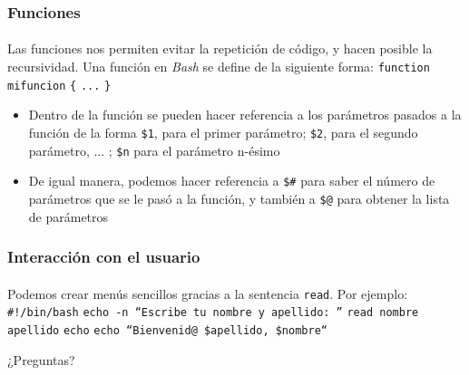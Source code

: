 \documentclass[12pt]{beamer}
\begin{document}
\begin{frame}
  \frametitle{Funciones}
  \framesubtitle{}
  Las funciones nos permiten evitar la repetición de código, y hacen posible la recursividad. Una función en \textit{Bash} se define de la siguiente forma:
  \medskip\linebreak
  \texttt{function mifuncion}\linebreak
  \texttt{\{}\linebreak
  \texttt{...}\linebreak
  \texttt{\}}
  \medskip
  \begin{itemize}
    \item  Dentro de la función se pueden hacer referencia a los parámetros pasados a la función de la forma \texttt{\$1}, para el primer parámetro; \texttt{\$2}, para el segundo parámetro, ... ; \texttt{\$n} para el parámetro n-ésimo
    \medskip
    \item De igual manera, podemos hacer referencia a \texttt{\$\#} para saber el número de parámetros que se le pasó a la función, y también a \texttt{\$@} para obtener la lista de parámetros
  \end{itemize}
\end{frame}

\begin{frame}
  \frametitle{Interacción con el usuario}
  \framesubtitle{}
  Podemos crear menús sencillos gracias a la sentencia \texttt{read}. Por ejemplo:
  \medskip\linebreak
  \texttt{\#!/bin/bash}\linebreak
  \texttt{echo -n ``Escribe tu nombre y apellido: ''}\linebreak
  \texttt{read nombre apellido}\linebreak
  \texttt{echo}\linebreak
  \texttt{echo ``Bienvenid@ \$apellido, \$nombre``}
\end{frame}

\begin{frame}
  \begin{center}
    \begin{Huge}¿Preguntas?\end{Huge}
  \end{center}
\end{frame}

\end{document}
